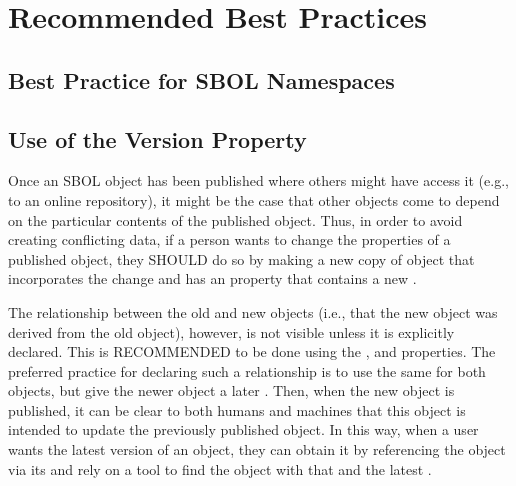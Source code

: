 \section{Recommended Best Practices}
\label{sec:bestpractices}
\subsection{Best Practice for SBOL Namespaces}


\subsection{Use of the Version Property}

Once an SBOL object has been published where others might have access it (e.g., to an online repository), it might be the case that other objects come to depend on the particular contents of the published object. 
Thus, in order to avoid creating conflicting data, if a person wants to change the properties of a published object, they SHOULD do so by making a new copy of object that incorporates the change and has an  property that contains a new .

The relationship between the old and new objects (i.e., that the new object was derived from the old object), however, is not visible unless it is explicitly declared.  This is RECOMMENDED to be done using the , and  properties. The preferred practice for declaring such a relationship is to use the same  for both objects, but give the newer object a later . Then, when the new object is published, it can be clear to both humans and machines that this object is intended to update the previously published object. In this way, when a user wants the latest version of an object, they can obtain it by referencing the object via its  and rely on a tool to find the object with that  and the latest .

